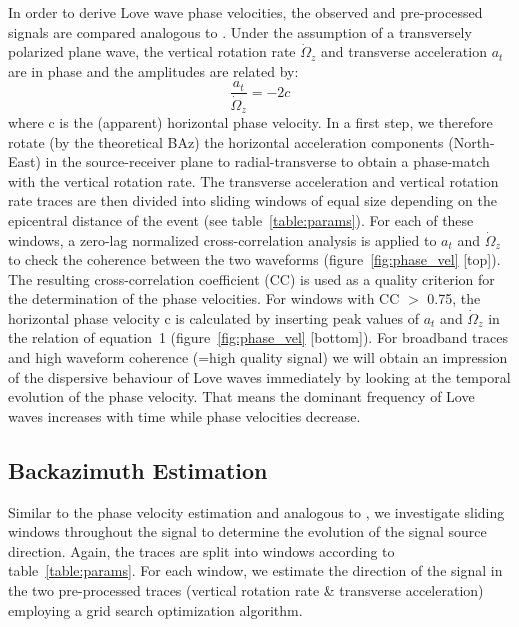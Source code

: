 \documentclass[12pt,reqno,letter]{article}
\begin{document}
In order to derive Love wave phase velocities, the observed and pre-processed signals are compared analogous to \cite{Igel2005}. Under the assumption of a transversely polarized plane wave, the vertical rotation rate $\dot{\Omega}_z$ and transverse acceleration $a_t$ are in phase and the amplitudes are related by: 
\begin{equation}
	\frac{a_t}{\dot{\Omega}_z} = -2c
\end{equation}
where c is the (apparent) horizontal phase velocity. In a first step, we therefore rotate (by the theoretical BAz) the horizontal acceleration components (North-East) in the source-receiver plane to radial-transverse to obtain a phase-match with the vertical rotation rate. The transverse acceleration and vertical rotation rate traces are then divided into sliding windows of equal size depending on the epicentral distance of the event (see table~\ref{table:params}).
For each of these windows, a zero-lag normalized cross-correlation analysis is applied to $a_t$ and $\dot{\Omega}_z$ to check the coherence between the two waveforms (figure~\ref{fig:phase_vel} [top]). The resulting cross-correlation coefficient (CC) is used as a quality criterion for the determination of the phase velocities. For windows with CC $>$ 0.75, the horizontal phase velocity c is calculated by inserting peak values of $a_t$ and $\dot{\Omega}_z$ in the relation of equation~1 (figure~\ref{fig:phase_vel} [bottom]).
For broadband traces and high waveform coherence (=high quality signal) we will obtain an impression of the dispersive behaviour of Love waves immediately by looking at the temporal evolution of the phase velocity. That means the dominant frequency of Love waves increases with time while phase velocities decrease.

\subsection*{Backazimuth Estimation}
\label{subsec:be}
Similar to the phase velocity estimation and analogous to \cite{Igel2007}, we investigate sliding windows throughout the signal to determine the evolution of the signal source direction.  Again, the traces are split into windows according to table~\ref{table:params}.
For each window, we estimate the direction of the signal in the two pre-processed traces (vertical rotation rate \& transverse acceleration) employing a grid search optimization algorithm. 
%
\end{document}

